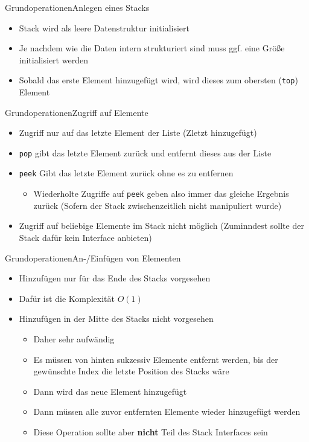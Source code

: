 \begin{frame}{Grundoperationen}{Anlegen eines Stacks}
	\begin{itemize}
		\item Stack wird als leere Datenstruktur initialisiert
		\item Je nachdem wie die Daten intern strukturiert sind muss ggf. eine Größe initialisiert werden
		\item Sobald das erste Element hinzugefügt wird, wird dieses zum obersten (\texttt{top}) Element
	\end{itemize}
\end{frame}

\begin{frame}{Grundoperationen}{Zugriff auf Elemente}
	\begin{itemize}
		\item Zugriff nur auf das letzte Element der Liste (Zletzt hinzugefügt)
		\item \texttt{pop} gibt das letzte Element zurück und entfernt dieses aus der Liste
		\item \texttt{peek} Gibt das letzte Element zurück ohne es zu entfernen
		\begin{itemize}
			\item Wiederholte Zugriffe auf \texttt{peek} geben also immer das gleiche Ergebnis zurück (Sofern der Stack zwischenzeitlich nicht manipuliert wurde)
		\end{itemize}
		\item Zugriff auf beliebige Elemente im Stack nicht möglich (Zuminndest sollte der Stack dafür kein Interface anbieten)
	\end{itemize}
\end{frame}

\begin{frame}{Grundoperationen}{An-/Einfügen von Elementen}
	\begin{itemize}
		\item Hinzufügen nur für das Ende des Stacks vorgesehen
		\item Dafür ist die Komplexität $O(1)$
		\item Hinzufügen in der Mitte des Stacks nicht vorgesehen
		\begin{itemize}
			\item Daher sehr aufwändig
			\item Es müssen von hinten sukzessiv Elemente entfernt werden, bis der gewünschte Index die letzte Position des Stacks wäre
			\item Dann wird das neue Element hinzugefügt
			\item Dann müssen alle zuvor entfernten Elemente wieder hinzugefügt werden
			\item Diese Operation sollte aber \textbf{nicht} Teil des Stack Interfaces sein
		\end{itemize}
	\end{itemize}
\end{frame}

